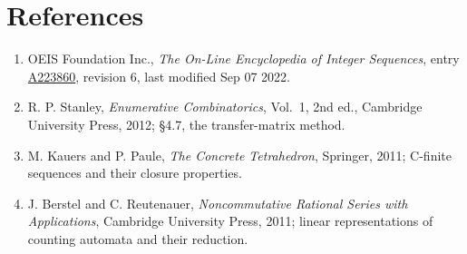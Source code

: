 \documentclass[11pt]{article}
\theoremstyle{definition}
\begin{document}
\section{References}

\begin{enumerate}

\item OEIS Foundation Inc., \emph{The On-Line Encyclopedia of Integer Sequences}, entry \href{https://oeis.org/A223860}{A223860}, revision 6, last modified Sep 07 2022.

\item R. P. Stanley, \emph{Enumerative Combinatorics}, Vol.~1, 2nd ed., Cambridge University Press, 2012; \S4.7, the transfer-matrix method.

\item M. Kauers and P. Paule, \emph{The Concrete Tetrahedron}, Springer, 2011; C-finite sequences and their closure properties.

\item J. Berstel and C. Reutenauer, \emph{Noncommutative Rational Series with Applications}, Cambridge University Press, 2011; linear representations of counting automata and their reduction.

\end{enumerate}
\end{document}
